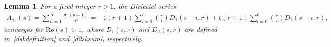 \documentclass[12pt, oneside,reqno]{amsart}
\numberwithin{equation}{section}
\newtheorem{lemma}[theorem]{Lemma}
\begin{document}



\begin{lemma}\label{shfiteddirichletseries}
For a fixed integer $r>1$, the Dirichlet series
\begin{align*}
A_{\sigma_r}(s)
=\sum_{n=1}^{\infty}\frac{\sigma_r(n+1)}{n^s}
=&\zeta(r+1)\sum_{i=0}^{r}\binom{r}{i}D_1(s-i,r)+\zeta(r+1)\sum_{i=0}^{r}\binom{r}{i}D_2(s-i,r),
\end{align*}
converges for $\mathrm{Re}(s)>1$, where $D_1(s,r)$ and $D_2(s,r)$ are defined in~\eqref{dskdefinition} and~\eqref{d2sksum}, respectively.
\end{lemma}
\end{document}
